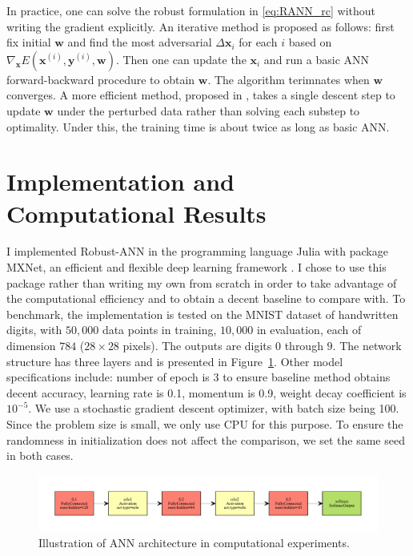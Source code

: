 \documentclass[twoside,12pt]{article}
\newcommand{\M}[1]{\boldsymbol{\mathbf{#1}}}
\begin{document}
In practice, one can solve the robust formulation in \eqref{eq:RANN_rc} without writing the gradient explicitly. An iterative method is proposed as follows: first fix initial $\M w$ and find the most adversarial $\Delta \M x_i$ for each $i$ based on $\nabla_{\M x} E(\M x^{(i)}, \M y^{(i)}, \M w)$. Then one can update the $\M x_i$ and run a basic ANN forward-backward procedure to obtain $\M w$. The algorithm terimnates when $\M w$ converges. A more efficient method, proposed in \cite{shaham2015understanding}, takes a single descent step to update $\M w$ under the perturbed data rather than solving each substep to optimality. Under this, the training time is about twice as long as basic ANN.


\section{Implementation and Computational Results}
I implemented Robust-ANN in the programming language \textsf{Julia} with package \textsf{MXNet}, an efficient and flexible deep learning framework \cite{mxnet}. I chose to use this package rather than writing my own from scratch in order to take advantage of the computational efficiency and to obtain a decent baseline to compare with. To benchmark, the implementation is tested on the MNIST dataset of handwritten digits, with $50,000$ data points in training, $10,000$ in evaluation, each of dimension $784$ ($28 \times 28$ pixels). The outputs are digits $0$ through $9$. The network structure has three layers and is presented in Figure~\ref{fig:ann_arc}. Other model specifications include: number of epoch is 3 to ensure baseline method obtains decent accuracy, learning rate is 0.1, momentum is 0.9, weight decay coefficient is $10^{-5}$. We use a stochastic gradient descent optimizer, with batch size being 100. Since the problem size is small, we only use CPU for this purpose. To ensure the randomness in initialization does not affect the comparison, we set the same seed in both cases.

\begin{figure}[ht!]
    \includegraphics[scale=0.7]{visualize.pdf}
    \caption{Illustration of ANN architecture in computational experiments.}
    \label{fig:ann_arc}
\end{figure}
\end{document}
